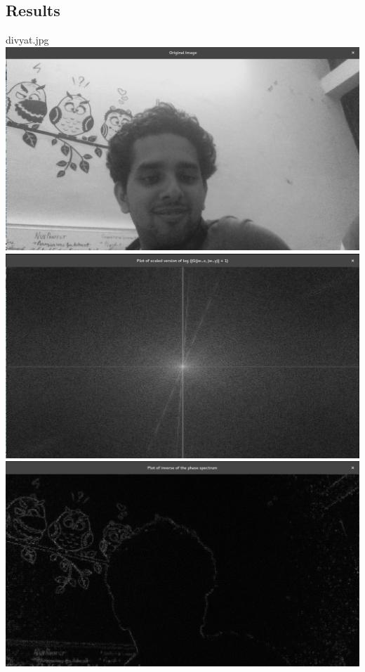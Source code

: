 \documentclass[a4paper,fleqn,11pt]{article}
\theoremstyle{mytheor}
\begin{document}
\subsection*{Results}
\begin{center}
divyat.jpg \\
\includegraphics[scale= 0.24]{../results/divyat.png}
\includegraphics[scale= 0.24]{../results/divyat_spectrum.png}
\includegraphics[scale= 0.24]{../results/divyat_phase.png}

\end{center}
\end{document}
